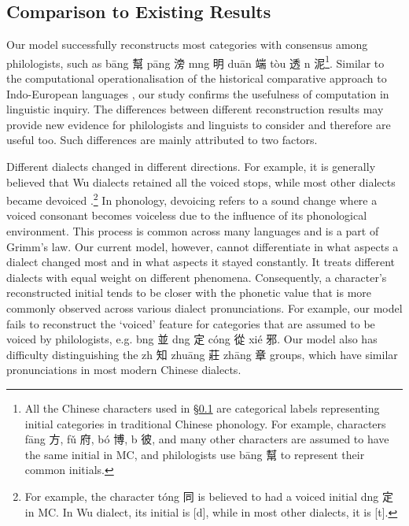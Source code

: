 \subsection{Comparison to Existing Results} \label{sec:comparison}
Our model successfully reconstructs most categories with consensus among philologists, such as b\=ang 幫 p\=ang 滂 m\textipa{\'\i}ng 明 du\=an 端 t\`ou 透 n\textipa{\'\i} 泥\footnote{All the Chinese characters used in \S\ref{sec:comparison} are categorical labels representing initial categories in traditional Chinese phonology. For example, characters f\=ang 方, f\v u 府,  b\'o 博, b\textipa{\v\i} 彼, and many other characters are assumed to have the same initial in MC, and philologists use b\=ang 幫 to represent their common initials.}.
Similar to the computational operationalisation of the historical comparative approach to Indo-European languages \citep{list-etal-2022-new}, our study confirms the usefulness of computation in linguistic inquiry.  
The differences between different reconstruction results may provide new evidence for philologists and linguists to consider and therefore are useful too.
Such differences are mainly attributed to two factors.

Different dialects changed in different directions. 
For example, it is generally believed that Wu dialects retained all the voiced stops, while most other dialects became devoiced \citep[pp.224--225]{huang2014handbook}.\footnote{For example, the character t\'ong 同 is believed to had a voiced initial d\textipa{\`\i}ng 定 in MC. In Wu dialect, its initial is [d], while in most other dialects, it is [t].}
In phonology, devoicing refers to a sound change where a voiced consonant becomes voiceless due to the influence of its phonological environment. This process is common across many languages and is a part of Grimm's law. 
Our current model, however, cannot differentiate in what aspects a dialect changed most and in what aspects it stayed constantly.
It treats different dialects with equal weight on different phenomena.
Consequently, a character's reconstructed initial tends to be closer with the phonetic value that is more commonly observed across various dialect pronunciations. 
For example, our model fails to reconstruct the `voiced' feature for categories that are assumed to be voiced by philologists, e.g. b\textipa{\`\i}ng 並 d\textipa{\`\i}ng 定 c\'ong 從 xi\'e 邪. 
Our model also has difficulty distinguishing the zh\textipa{\=\i} 知 zhu\=ang 莊 zh\=ang 章 groups, which have similar pronunciations in most modern Chinese dialects.

